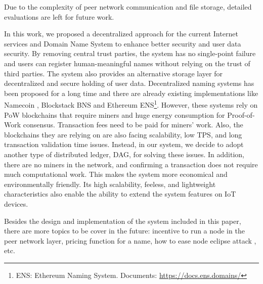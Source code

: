 Due to the complexity of peer network communication and file storage, detailed evaluations are left for future work.

In this work, we proposed a decentralized approach for the current Internet services and Domain Name System to enhance better security and user data security.
By removing central trust parties, the system has no single-point failure and users can register human-meaningful names without relying on the trust of third parties.
The system also provides an alternative storage layer for decentralized and secure holding of user data.
Decentralized naming systems has been proposed for a long time and there are already existing implementations like Namecoin \cite{kalodner2015empirical}, Blockstack BNS \cite{ali2017blockstack} and Ethereum ENS\footnote{ENS: Ethereum Naming System. Documents: \url{https://docs.ens.domains/}}. However, these systems rely on PoW blockchains that require miners and huge energy consumption for Proof-of-Work consensus.
Transaction fees need to be paid for miners' work.
Also, the blockchains they are relying on are also facing scalability, low TPS, and long transaction validation time issues.
Instead, in our system, we decide to adopt another type of distributed ledger, DAG, for solving these issues. In addition, there are no miners in the network, and confirming a transaction does not require much computational work. This makes the system more economical and environmentally friendly. Its high scalability, feeless, and lightweight characteristics also enable the ability to extend the system features on IoT devices.

Besides the design and implementation of the system included in this paper, there are more topics to be cover in the future: incentive to run a node in the peer network layer, pricing function for a name, how to ease node eclipse attack \cite{singh2006eclipse}, etc.
